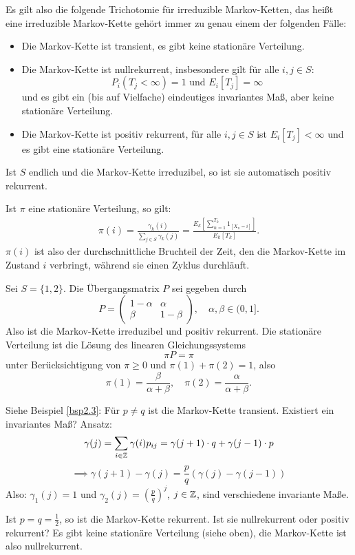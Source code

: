 \documentclass[a4paper,twoside,DIV15,BCOR12mm]{scrbook}
\begin{document}
\begin{bemerkung}
\begin{enumi}
\item Es gilt also die folgende Trichotomie für irreduzible Markov-Ketten, das heißt eine irreduzible Markov-Kette gehört immer zu genau einem der folgenden Fälle:
\begin{itemize}
\item Die Markov-Kette ist transient, es gibt keine stationäre Verteilung.
\item Die Markov-Kette ist nullrekurrent, insbesondere gilt für alle $i,j\in S$:
\[P_i(T_j<\infty) = 1\text{ und }E_i[T_j]=\infty\]
und es gibt ein (bis auf Vielfache) eindeutiges invariantes Maß, aber keine stationäre Verteilung.
\item Die Markov-Kette ist positiv rekurrent, für alle $i,j\in S$ ist $E_i[T_j]<\infty$ und es gibt eine stationäre Verteilung.
\end{itemize}

\item Ist $S$ endlich und die Markov-Kette irreduzibel, so ist sie automatisch positiv rekurrent.

\item Ist $\pi$ eine stationäre Verteilung, so gilt:
\begin{align*}
\pi(i) = \frac{\gamma_k(i)}{\sum_{j\in S} \gamma_k(j)}
= \frac{E_k[\sum_{n=1}^{T_k} 1_{[X_n=i]}]}{E_k[T_k]}.
\end{align*}
$\pi(i)$ ist also der durchschnittliche Bruchteil der Zeit, den die Markov-Kette im Zustand $i$ verbringt, während sie einen Zyklus durchläuft.
\end{enumi}
\end{bemerkung}

\begin{beispiel}
Sei $S=\{1,2\}$. Die Übergangsmatrix $P$ sei gegeben durch 
\[
P=
\begin{pmatrix}
1-\alpha & \alpha \\
\beta & 1-\beta
\end{pmatrix}, \quad \alpha,\beta \in (0,1].
\]
Also ist die Markov-Kette irreduzibel und positiv rekurrent. Die stationäre Verteilung ist die Lösung des linearen Gleichungssystems
\[ \pi P = \pi\]
unter Berücksichtigung von $\pi \ge 0$ und $\pi(1) + \pi(2) = 1$,
also
\[
\pi(1) = \frac\beta{\alpha + \beta}, \quad \pi(2)=\frac{\alpha}{\alpha+\beta}.
\]
\end{beispiel}

\begin{beispiel}[Irrfahrt]
Siehe Beispiel \ref{bsp2.3}: Für $p\ne q$ ist die Markov-Kette transient. Existiert ein invariantes Maß? Ansatz:
\[
\gamma(j) = \sum_{i\in \mathbb{Z}} \gamma (i) p_{ij} = \gamma(j+1)\cdot q + \gamma(j-1)\cdot p
\]
\[
\implies \gamma(j+1) - \gamma(j) = \frac pq (\gamma(j) - \gamma(j-1))
\]
Also: $\gamma_1(j) = 1$  und $\gamma_2(j) = (\frac pq)^{j}$, $j\in \mathbb{Z}$, sind verschiedene invariante Maße.

Ist $p=q=\frac 12$, so ist die Markov-Kette rekurrent. Ist sie nullrekurrent oder positiv rekurrent? Es gibt keine stationäre Verteilung (siehe oben), die Markov-Kette ist also nullrekurrent.
\end{beispiel}
\end{document}
